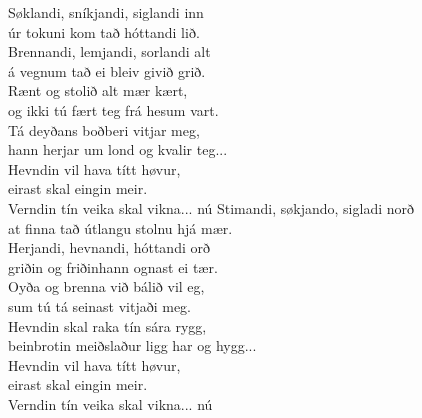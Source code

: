\nxt
{}

\begin{flushleft}
Søklandi, sníkjandi, siglandi inn\\
úr tokuni kom tað hóttandi lið.\\
Brennandi, lemjandi, sorlandi alt\\
á vegnum tað ei bleiv givið grið.\\
Rænt og stolið alt mær kært,\\
og ikki tú fært teg frá hesum vart.\\
Tá deyðans boðberi vitjar meg,\\
hann herjar um lond og kvalir teg...
\hops
\hspace{0.9cm}\\
\hspace{0.9cm}Hevndin vil hava títt høvur,\\
\hspace{0.9cm}eirast skal eingin meir.\\
\hspace{0.9cm}Verndin tín veika skal vikna... nú
\hops
Stimandi, søkjando, sigladi norð\\
at finna tað útlangu stolnu hjá mær.\\
Herjandi, hevnandi, hóttandi orð\\
griðin og friðinhann ognast ei tær.\\
Oyða og brenna við bálið vil eg,\\
sum tú tá seinast vitjaði meg.\\
Hevndin skal raka tín sára rygg,\\
beinbrotin meiðslaður ligg har og hygg...
\hops
\hspace{0.9cm}\\
\hspace{0.9cm}Hevndin vil hava títt høvur,\\
\hspace{0.9cm}eirast skal eingin meir.\\
\hspace{0.9cm}Verndin tín veika skal vikna... nú

\end{flushleft}

